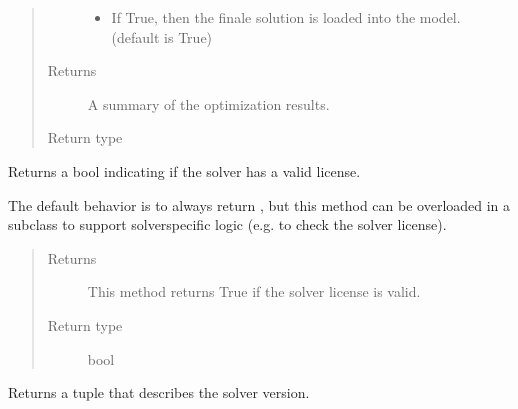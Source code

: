 \documentclass[letterpaper,10pt,english]{sphinxmanual}
\begin{document}
\begin{fulllineitems}
\begin{fulllineitems}
\begin{quote}
\begin{description}
\begin{itemize}
\item {} 
 \textendash{} If True, then the finale solution is loaded into the model. (default is True)

\end{itemize}

\item[{Returns}] \leavevmode
A summary of the optimization results.

\item[{Return type}] \leavevmode
{\hyperref[\detokenize{reference/solverapi:pao.common.solver.Results}]{}}

\end{description}\end{quote}

\end{fulllineitems}


\begin{fulllineitems}
\label{\detokenize{reference/solverapi:pao.common.solver.SolverAPI.valid_license}}
Returns a bool indicating if the solver has a valid license.

The default behavior is to always return , but this method
can be overloaded in a subclass to support solver\sphinxhyphen{}specific logic
(e.g.  to check the solver license).
\begin{quote}\begin{description}
\item[{Returns}] \leavevmode
This method returns True if the solver license is valid.

\item[{Return type}] \leavevmode
bool

\end{description}\end{quote}

\end{fulllineitems}


\begin{fulllineitems}
\label{\detokenize{reference/solverapi:pao.common.solver.SolverAPI.version}}
Returns a tuple that describes the solver version.


\end{fulllineitems}
\end{fulllineitems}
\end{document}
